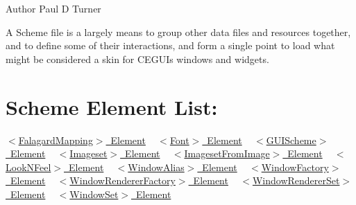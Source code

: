 \begin{DoxyAuthor}{Author}
Paul D Turner
\end{DoxyAuthor}
A Scheme file is a largely means to group other data files and resources together, and to define some of their interactions, and form a single point to load what might be considered a \textquotesingle{}skin\textquotesingle{} for C\+E\+G\+UI\textquotesingle{}s windows and widgets.\hypertarget{xml_scheme_xml_scheme_contents}{}\section{Scheme Element List\+:}\label{xml_scheme_xml_scheme_contents}
\mbox{\hyperlink{xml_scheme_xml_scheme_falagardmapping}{$<$\+Falagard\+Mapping$>$ Element}} ~\newline
 \mbox{\hyperlink{xml_scheme_xml_scheme_font}{$<$\+Font$>$ Element}} ~\newline
 \mbox{\hyperlink{xml_scheme_xml_scheme_guischeme}{$<$\+G\+U\+I\+Scheme$>$ Element}} ~\newline
 \mbox{\hyperlink{xml_scheme_xml_scheme_imageset}{$<$\+Imageset$>$ Element}} ~\newline
 \mbox{\hyperlink{xml_scheme_xml_scheme_imagesetfromimage}{$<$\+Imageset\+From\+Image$>$ Element}} ~\newline
 \mbox{\hyperlink{xml_scheme_xml_scheme_looknfeel}{$<$\+Look\+N\+Feel$>$ Element}} ~\newline
 \mbox{\hyperlink{xml_scheme_xml_scheme_windowalias}{$<$\+Window\+Alias$>$ Element}} ~\newline
 \mbox{\hyperlink{xml_scheme_xml_scheme_windowfactory}{$<$\+Window\+Factory$>$ Element}} ~\newline
 \mbox{\hyperlink{xml_scheme_xml_scheme_windowrendererfactory}{$<$\+Window\+Renderer\+Factory$>$ Element}} ~\newline
 \mbox{\hyperlink{xml_scheme_xml_scheme_windowrendererset}{$<$\+Window\+Renderer\+Set$>$ Element}} ~\newline
 \mbox{\hyperlink{xml_scheme_xml_scheme_windowset}{$<$\+Window\+Set$>$ Element}} ~\newline


